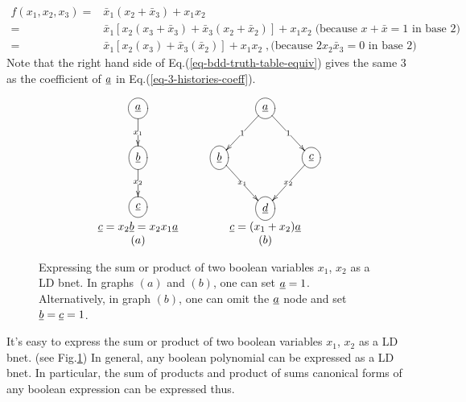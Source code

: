 \begin{align}
f(x_1, x_2,x_3) =&
\bar{x}_1(x_2+\bar{x}_3)  + x_1 x_2
\\
=&
\bar{x}_1[x_2(x_3+\bar{x}_3)+\bar{x}_3
(x_2+ \bar{x}_2)]  + x_1 x_2
\;\text{(because $x+\bar{x}=1$ in base 2)}
\\
=&
\bar{x}_1[x_2(x_3)+\bar{x}_3
(\bar{x}_2)]  + x_1 x_2\;, \text{
(because $2x_2\bar{x}_3=0$ in base 2)
}
\label{eq-bdd-truth-table-equiv}
\end{align}
Note that the right
hand side of Eq.(\ref{eq-bdd-truth-table-equiv})
gives the same 3 
as the coefficient of $\rva$ in
 Eq.(\ref{eq-3-histories-coeff}).

\begin{figure}[h!]
$$
\begin{array}{ccc}
\xymatrix{
\Circle{\rva}
\ar[d]|{x_1}
\\
\Circle{\rvb}
\ar[d]|{x_2}
\\
\Circle{\rvc}
}
&\;\;\;&
\xymatrix{
&\Circle{\rva}\ar[dl]|1
\ar[dr]|1
\\
\Circle{\rvb}\ar[dr]|{x_1}
&&\Circle{\rvc}\ar[dl]|{x_2}
\\
&\Circle{\rvd}
}
\\
\rvc=x_2\rvb=x_2x_1\rva
&&
\rvc= (x_1 + x_2)\rva
\\
(a)&&(b)
\end{array}
$$
\caption{Expressing the sum or product
of two boolean variables $x_1$, $x_2$
as a LD bnet. In graphs $(a)$ and $(b)$,
one can set $\rva=1$. Alternatively,
in graph $(b)$, one  can
omit the $\rva$ node and set $\rvb=\rvc=1$.}
\label{fig-bdd-and-or}
\end{figure}

It's easy to  express the sum or product
of two boolean variables $x_1$, $x_2$
as a LD bnet.
(see Fig.\ref{fig-bdd-and-or})
In general, any boolean polynomial
can be expressed as a LD bnet. In particular, the sum of products and product of sums
canonical forms
of any boolean expression can be expressed
thus.

